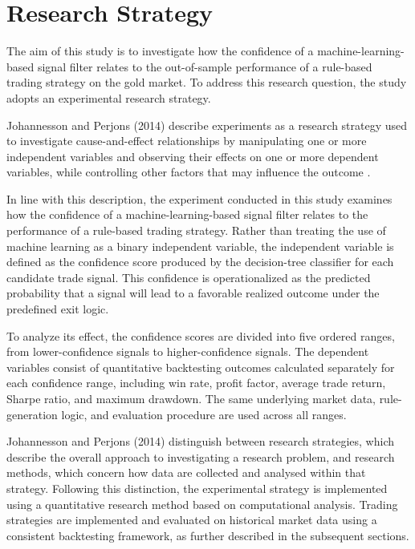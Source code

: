 \section{Research Strategy}

The aim of this study is to investigate how the confidence of a machine-learning-based signal filter relates to the out-of-sample performance of a rule-based trading strategy on the gold market. To address this research question, the study adopts an experimental research strategy.

Johannesson and Perjons (2014) describe experiments as a research strategy used to investigate cause-and-effect relationships by manipulating one or more independent variables and observing their effects on one or more dependent variables, while controlling other factors that may influence the outcome \citep{johannesson2014design}.

In line with this description, the experiment conducted in this study examines how the confidence of a machine-learning-based signal filter relates to the performance of a rule-based trading strategy. Rather than treating the use of machine learning as a binary independent variable, the independent variable is defined as the confidence score produced by the decision-tree classifier for each candidate trade signal. This confidence is operationalized as the predicted probability that a signal will lead to a favorable realized outcome under the predefined exit logic.

To analyze its effect, the confidence scores are divided into five ordered ranges, from lower-confidence signals to higher-confidence signals. The dependent variables consist of quantitative backtesting outcomes calculated separately for each confidence range, including win rate, profit factor, average trade return, Sharpe ratio, and maximum drawdown. The same underlying market data, rule-generation logic, and evaluation procedure are used across all ranges.

Johannesson and Perjons (2014) distinguish between research strategies, which describe the overall approach to investigating a research problem, and research methods, which concern how data are collected and analysed within that strategy. Following this distinction, the experimental strategy is implemented using a quantitative research method based on computational analysis. Trading strategies are implemented and evaluated on historical market data using a consistent backtesting framework, as further described in the subsequent sections.





